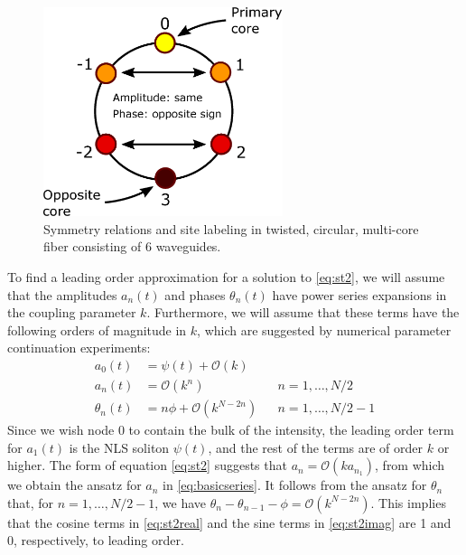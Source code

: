 \documentclass[11pt,reqno]{amsart}
\begin{document}
\begin{figure}
\begin{center}
\includegraphics[width=7cm]{symm6}
\end{center}
\caption{Symmetry relations and site labeling in twisted, circular, multi-core fiber consisting of 6 waveguides.}
\label{fig:symm6}
\end{figure}

To find a leading order approximation for a solution to \cref{eq:st2}, we will assume that the amplitudes $a_n(t)$ and phases $\theta_n(t)$ have power series expansions in the coupling parameter $k$. Furthermore, we will assume that these terms have the following orders of magnitude in $k$, which are suggested by numerical parameter continuation experiments:
\begin{equation}\label{eq:basicseries}
\begin{aligned}
a_0(t) &= \psi(t) + \mathcal{O}\left(k\right) \\
a_n(t) &= \mathcal{O}\left(k^n\right) && n = 1, \dots, N/2 \\
\theta_n(t) &= n \phi + \mathcal{O}\left(k^{N - 2n}\right) && n = 1, \dots, N/2-1
\end{aligned}
\end{equation}
Since we wish node 0 to contain the bulk of the intensity, the leading order term for $a_1(t)$ is the NLS soliton $\psi(t)$, and the rest of the terms are of order $k$ or higher. The form of equation \cref{eq:st2} suggests that $a_n = \mathcal{O}(k a_{n_1})$, from which we obtain the ansatz for $a_n$ in \cref{eq:basicseries}. It follows from the ansatz for $\theta_n$ that, for $n = 1, \dots, N/2-1$, we have $\theta_n - \theta_{n-1} - \phi = \mathcal{O}\left(k^{N - 2n}\right)$. This implies that the cosine terms in \cref{eq:st2real} and the sine terms in \cref{eq:st2imag} are 1 and 0, respectively, to leading order.
\end{document}
